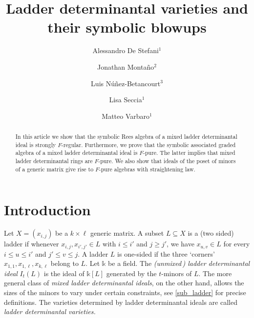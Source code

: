 \documentclass[12pt]{amsart}
\author[A. De Stefani]{Alessandro De Stefani$^1$}
\author[J. Montaño]{Jonathan Monta\~no$^2$}
\author[L. N{\'u}{\~n}ez-Betancourt]{Luis N{\'u}{\~n}ez-Betancourt$^3$}
\author[L. Seccia]{Lisa Seccia$^1$}
\author[M. Varbaro]{Matteo Varbaro$^1$}
\renewcommand{\leq}{\leqslant}
\renewcommand{\geq}{\geqslant}
\theoremstyle{definition}
\renewcommand{\(}{\left(}
\renewcommand{\)}{\right)}
\newcommand{\ZZ}{\mathbb{Z}}
\newcommand{\kk}{\mathbb{k}}
\renewcommand{\!}[1]{{\color{red}\text{\Huge$\star$ }#1}}
\newcommand{\ttt}{{\bf t}}
\begin{document}

\title[Ladder determinantal varieties and their symbolic blowups]%
{Ladder determinantal varieties and their symbolic blowups} %



\begin{abstract} 
	 In this article we show that  the symbolic Rees algebra of a mixed ladder determinantal ideal is strongly $F$-regular.
	 Furthermore, we prove that the  symbolic associated graded algebra of a  mixed ladder determinantal ideal is $F$-pure. The latter implies that  mixed ladder determinantal rings are $F$-pure. We also show that  ideals  of the poset of minors of a generic matrix give rise to $F$-pure algebras with straightening law. 
\end{abstract}




\maketitle

\section{Introduction}\label{Intro}
Let $X=(x_{i,j})$ be a $k\times \ell$ generic matrix. 
A subset $L\subseteq X$ is a  (two sided) ladder if whenever  $x_{i,j},x_{i',j'} \in L$ with $i \leq i'$ and $j \geq j'$,  we have $x_{u,v} \in L$ for every $i \leq  u \leq  i'$ and $j' \leq  v \leq  j$.   A ladder $L$ is  one-sided if the three `corners' $x_{1,1}, x_{1,\ell}, x_{k,\ell}$ belong to $L$. Let  $\kk$ be a field. The {\it {\rm (}unmixed\,{\rm )} ladder determinantal ideal} $I_t(L)$ is the ideal of $\kk[L]$ generated by the $t$-minors of $L$. The more general class of {\it mixed ladder determinantal ideals}, on the other hand, allows the sizes of the minors to vary  under  certain constraints,  %
 see \autoref{sub_ladder} for precise definitions. The varieties determined by ladder determinantal ideals are called {\it ladder determinantal varieties.}
\end{document}
